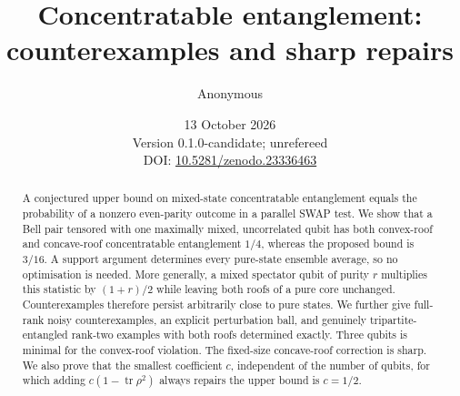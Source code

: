 \documentclass[11pt,a4paper]{article}
\title{Concentratable entanglement:\\ counterexamples and sharp repairs}
\author{Anonymous}
\date{13 October 2026\\ \small Version 0.1.0-candidate; unrefereed\\ \small DOI: \href{https://doi.org/10.5281/zenodo.23336463}{10.5281/zenodo.23336463}}
\newcommand{\tr}{\operatorname{tr}}
\begin{document}
\maketitle
\vspace{-7mm}
\begin{abstract}
A conjectured upper bound on mixed-state concentratable entanglement equals the probability of a nonzero even-parity outcome in a parallel SWAP test. We show that a Bell pair tensored with one maximally mixed, uncorrelated qubit has both convex-roof and concave-roof concentratable entanglement $1/4$, whereas the proposed bound is $3/16$. A support argument determines every pure-state ensemble average, so no optimisation is needed. More generally, a mixed spectator qubit of purity $r$ multiplies this statistic by $(1+r)/2$ while leaving both roofs of a pure core unchanged. Counterexamples therefore persist arbitrarily close to pure states. We further give full-rank noisy counterexamples, an explicit perturbation ball, and genuinely tripartite-entangled rank-two examples with both roofs determined exactly. Three qubits is minimal for the convex-roof violation. The fixed-size concave-roof correction is sharp. We also prove that the smallest coefficient $c$, independent of the number of qubits, for which adding $c(1-\tr\rho^2)$ always repairs the upper bound is $c=1/2$.
\end{abstract}
\end{document}
